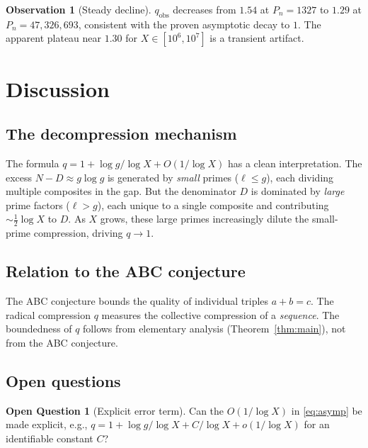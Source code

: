 \documentclass[11pt, a4paper]{article}
\theoremstyle{definition}
\newtheorem{observation}[theorem]{Observation}
\newtheorem{question}[theorem]{Open Question}
\theoremstyle{remark}
\begin{document}
\begin{observation}[Steady decline]\label{obs:decline}
$q_{\mathrm{obs}}$ decreases from $1.54$ at
$P_n = 1327$ to $1.29$ at $P_n = 47{,}326{,}693$,
consistent with the proven asymptotic decay to $1$.
The apparent plateau near $1.30$ for
$X \in [10^6, 10^7]$ is a transient artifact.
\end{observation}

\section{Discussion}\label{sec:discussion}

\subsection{The decompression mechanism}

The formula $q = 1 + \log g/\log X + O(1/\log X)$
has a clean interpretation.
The excess $N - D \approx g\log g$ is generated by
\emph{small} primes ($\ell \le g$), each dividing multiple
composites in the gap.
But the denominator $D$ is dominated by \emph{large}
prime factors ($\ell > g$), each unique to a single
composite and contributing $\sim \tfrac{1}{2}\log X$
to $D$.
As $X$ grows, these large primes increasingly dilute
the small-prime compression, driving $q \to 1$.

\subsection{Relation to the ABC conjecture}

The ABC conjecture bounds the quality of individual triples
$a + b = c$.
The radical compression $q$ measures the collective
compression of a \emph{sequence}.
The boundedness of $q$ follows from elementary analysis
(Theorem~\ref{thm:main}), not from the ABC conjecture.

\subsection{Open questions}

\begin{question}[Explicit error term]\label{q:explicit}
Can the $O(1/\log X)$ in \eqref{eq:asymp} be made
explicit, e.g., $q = 1 + \log g/\log X + C/\log X + o(1/\log X)$
for an identifiable constant $C$?
\end{question}
\end{document}
